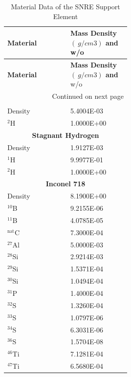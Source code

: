 \documentclass[8pt,a4paper]{article}
\begin{document}
\begin{longtable}{|m{0.3\linewidth}|m{0.2\linewidth}|}
    \caption{Material Data of the SNRE Support Element} \\
    
    \hline \textbf{Material} & \textbf{Mass Density $(\SI{}{g/cm3})$ and} w/o \\ \hline 
    \endfirsthead
    
    
    \hline \textbf{Material} & \textbf{Mass Density $(\SI{}{g/cm3})$ and} w/o \\ \hline 
    \endhead
    
    \hline \multicolumn{2}{|r|}{{Continued on next page}} \\ \hline
    \endfoot
    
    \hline
    \endlastfoot
    \multicolumn{2}{|c|}{\textbf{Support Element Coolant}}\\\hline
    Density & \SI{5.4004E-03}{} \\
    $^{2}$H & \SI{1.0000E+00}{} \\\hline
    \multicolumn{2}{|c|}{\textbf{Stagnant Hydrogen}}\\\hline
    Density & \SI{1.9127E-03}{} \\
    $^{1}$H & \SI{9.9977E-01}{} \\
    $^{2}$H & \SI{1.0000E+00}{} \\\hline
    \multicolumn{2}{|c|}{\textbf{Inconel 718}}\\\hline
    Density & \SI{8.1900E+00}{} \\
    $^{10}$B & \SI{9.2155E-06}{} \\
    $^{11}$B & \SI{4.0785E-05}{} \\
    $^{\text{nat}}$C & \SI{7.3000E-04}{} \\
    $^{27}$Al & \SI{5.0000E-03}{} \\
    $^{28}$Si & \SI{2.9214E-03}{} \\
    $^{29}$Si & \SI{1.5371E-04}{} \\
    $^{30}$Si & \SI{1.0494E-04}{} \\
    $^{31}$P & \SI{1.4000E-04}{} \\
    $^{32}$S & \SI{1.3260E-04}{} \\
    $^{33}$S & \SI{1.0797E-06}{} \\
    $^{34}$S & \SI{6.3031E-06}{} \\
    $^{36}$S & \SI{1.5704E-08}{} \\
    $^{46}$Ti & \SI{7.1281E-04}{} \\
    $^{47}$Ti & \SI{6.5680E-04}{} \\

\end{longtable}
\end{document}
